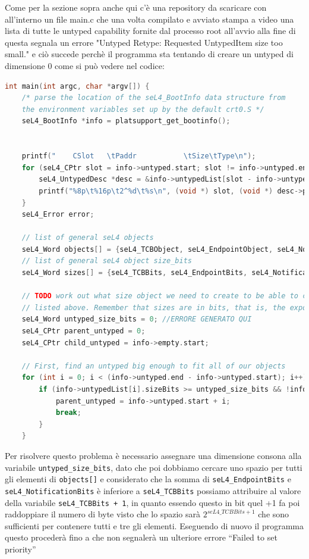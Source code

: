 Come per la sezione sopra anche qui c'è una repository da scaricare con all'interno un file main.c che una volta compilato e avviato stampa a video una lista di tutte le untyped capability fornite dal processo root all'avvio alla fine di questa segnala un errore "Untyped Retype: Requested UntypedItem size too small." e ciò succede perchè il programma sta tentando di creare un untyped di dimensione 0 come si può vedere nel codice:
\begin{lstlisting}[basicstyle=\tiny, language=C++]
int main(int argc, char *argv[]) {
    /* parse the location of the seL4_BootInfo data structure from
    the environment variables set up by the default crt0.S */
    seL4_BootInfo *info = platsupport_get_bootinfo();


    printf("    CSlot   \tPaddr           \tSize\tType\n");
    for (seL4_CPtr slot = info->untyped.start; slot != info->untyped.end; slot++) {
        seL4_UntypedDesc *desc = &info->untypedList[slot - info->untyped.start];
        printf("%8p\t%16p\t2^%d\t%s\n", (void *) slot, (void *) desc->paddr, desc->sizeBits, desc->isDevice ? "device untyped" : "untyped");
    }
    seL4_Error error;

    // list of general seL4 objects
    seL4_Word objects[] = {seL4_TCBObject, seL4_EndpointObject, seL4_NotificationObject};
    // list of general seL4 object size_bits
    seL4_Word sizes[] = {seL4_TCBBits, seL4_EndpointBits, seL4_NotificationBits};

    // TODO work out what size object we need to create to be able to create all of the objects
    // listed above. Remember that sizes are in bits, that is, the exponents of powers of two.
    seL4_Word untyped_size_bits = 0; //ERRORE GENERATO QUI
    seL4_CPtr parent_untyped = 0;
    seL4_CPtr child_untyped = info->empty.start;

    // First, find an untyped big enough to fit all of our objects
    for (int i = 0; i < (info->untyped.end - info->untyped.start); i++) {
        if (info->untypedList[i].sizeBits >= untyped_size_bits && !info->untypedList[i].isDevice) {
            parent_untyped = info->untyped.start + i;
            break;
        }
    }
\end{lstlisting}
Per risolvere questo problema è necessario assegnare una dimensione consona alla variabile \texttt{untyped\_size\_bits}, dato che poi dobbiamo cercare uno spazio per tutti gli elementi di \texttt{objects[]} e considerato che la somma di \texttt{seL4\_EndpointBits} e \texttt{seL4\_NotificationBits} è inferiore a \texttt{seL4\_TCBBits} possiamo attribuire al valore della variabile \texttt{seL4\_TCBBits + 1}, in quanto essendo questo in bit quel +1 fa poi raddoppiare il numero di byte visto che lo spazio sarà $ 2^{seL4\_TCBBits + 1} $ che sono sufficienti per contenere tutti e tre gli elementi. Eseguendo di nuovo il programma questo procederà fino a che non segnalerà un ulteriore errore “Failed to set priority”
